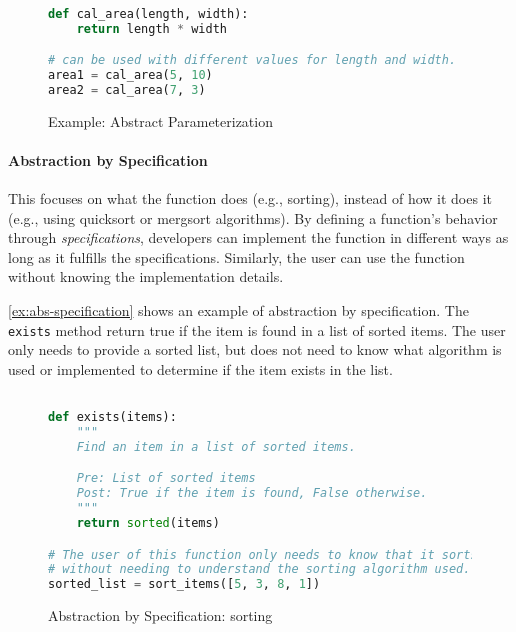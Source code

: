 \documentclass[oneside,11pt,dvipsnames]{book}
\begin{document}
\begin{figure}
\begin{lstlisting}[language=Python, keywordstyle=\color{blue}, commentstyle=\color{green!60!black}, stringstyle=\color{red}, basicstyle=\ttfamily\scriptsize]

def cal_area(length, width):
    return length * width

# can be used with different values for length and width.
area1 = cal_area(5, 10)
area2 = cal_area(7, 3)
\end{lstlisting}
 \caption{Example: Abstract Parameterization}\label{ex:abs-parameterization}

\end{figure}



\paragraph{Abstraction by Specification} This focuses on what the function does (e.g., sorting), instead of how it does it (e.g., using quicksort or mergsort algorithms). By defining a function's behavior through \emph{specifications}, developers can implement the function in different ways as long as it fulfills the specifications. Similarly, the user can use the function without knowing the implementation details. 

\autoref{ex:abs-specification} shows an example of abstraction by specification. The \texttt{exists} method return true if the item is found in a list of sorted items. The user only needs to provide a sorted list, but does not need to know what algorithm is used or implemented to determine if the item exists in the list.

\begin{figure}
\begin{lstlisting}[language=Python, keywordstyle=\color{blue}, commentstyle=\color{green!60!black}, stringstyle=\color{red}, basicstyle=\ttfamily\scriptsize]

def exists(items):
    """
    Find an item in a list of sorted items.

    Pre: List of sorted items
    Post: True if the item is found, False otherwise.
    """
    return sorted(items)

# The user of this function only needs to know that it sorts items,
# without needing to understand the sorting algorithm used.
sorted_list = sort_items([5, 3, 8, 1])
\end{lstlisting}
\caption{Abstraction by Specification: sorting}\label{ex:abs-specification}
\end{figure}
\end{document}
